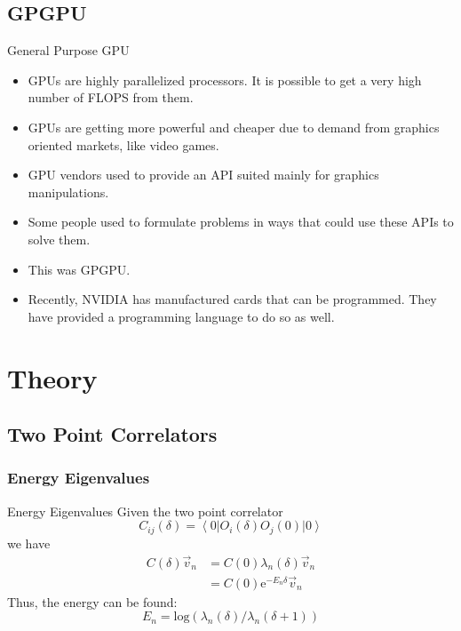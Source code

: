 \documentclass[xcolor=svgnames]{beamer}
\def\flops{{FLOPS}}
\newcommand{\ket}[1]{\ensuremath{\left| #1 \right>}} %
\newcommand{\bra}[1]{\ensuremath{\left< #1 \right|}} %
\renewcommand{\exp}[1]{\ensuremath{\textrm{e}^{ #1 }}}
\renewcommand{\log}[1]{\ensuremath{\textrm{log}\left( #1 \right)}}
\begin{document}
\subsection{GPGPU}

\begin{frame}{General Purpose GPU}
 \begin{itemize}
  \item GPUs are highly parallelized processors. It is possible to get a very high number of \flops{} from them.
  \item GPUs are getting more powerful and cheaper due to demand from graphics oriented markets, like video games.
  \item GPU vendors used to provide an API suited mainly for graphics manipulations.
  \item Some people used to formulate problems in ways that could use these APIs to solve them.
  \item This was GPGPU.
  \item Recently, NVIDIA has manufactured cards that can be programmed. They have provided a programming language to do so as well.
 \end{itemize}
\end{frame}


\section{Theory}

\subsection{Two Point Correlators}

\subsubsection{Energy Eigenvalues}

\begin{frame}{Energy Eigenvalues}
Given the two point correlator
%
\begin{equation*}
C_{ij}(\delta) = \bra{0} O_i(\delta) O_j(0) \ket{0}
\end{equation*}
%
we have
%
\begin{align*}
C(\delta)\vec{v}_n 	&= C(0) \lambda_n(\delta) \vec{v}_n\\
			&= C(0) \exp{-E_n \delta} \vec{v}_n
\end{align*}
%
Thus, the energy can be found:
%
\begin{equation*}
E_n = \log{\lambda_n(\delta)/\lambda_n(\delta+1)}
\end{equation*}
\end{frame}
\end{document}

